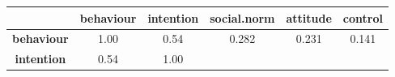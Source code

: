 \documentclass[]{article}
\theoremstyle{definition}
\theoremstyle{definition}
\theoremstyle{definition}
\theoremstyle{remark}
\begin{document}
\begin{longtable}[]{@{}cccccc@{}}
\toprule
\begin{minipage}[b]{0.19\columnwidth}\centering\strut
~\strut
\end{minipage} & \begin{minipage}[b]{0.13\columnwidth}\centering\strut
behaviour\strut
\end{minipage} & \begin{minipage}[b]{0.13\columnwidth}\centering\strut
intention\strut
\end{minipage} & \begin{minipage}[b]{0.15\columnwidth}\centering\strut
social.norm\strut
\end{minipage} & \begin{minipage}[b]{0.12\columnwidth}\centering\strut
attitude\strut
\end{minipage} & \begin{minipage}[b]{0.12\columnwidth}\centering\strut
control\strut
\end{minipage}\tabularnewline
\midrule
\endhead
\begin{minipage}[t]{0.19\columnwidth}\centering\strut
\textbf{behaviour}\strut
\end{minipage} & \begin{minipage}[t]{0.13\columnwidth}\centering\strut
1.00\strut
\end{minipage} & \begin{minipage}[t]{0.13\columnwidth}\centering\strut
0.54\strut
\end{minipage} & \begin{minipage}[t]{0.15\columnwidth}\centering\strut
0.282\strut
\end{minipage} & \begin{minipage}[t]{0.12\columnwidth}\centering\strut
0.231\strut
\end{minipage} & \begin{minipage}[t]{0.12\columnwidth}\centering\strut
0.141\strut
\end{minipage}\tabularnewline
\begin{minipage}[t]{0.19\columnwidth}\centering\strut
\textbf{intention}\strut
\end{minipage} & \begin{minipage}[t]{0.13\columnwidth}\centering\strut
0.54\strut
\end{minipage} & \begin{minipage}[t]{0.13\columnwidth}\centering\strut
1.00\strut
\end{minipage} & \begin{minipage}[t]{0.15\columnwidth}\centering\strut

\end{minipage}
\end{longtable}
\end{document}
